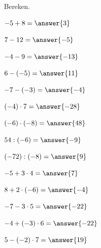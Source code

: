 \documentclass{ximera}
\begin{document}
\begin{oefening}{\oefB\ESS}

Bereken.

\begin{question} \(-5+8=\answer{3}\) \end{question}

\begin{question} \(7-12=\answer{-5}\) \end{question}

\begin{question} \(-4-9=\answer{-13}\) \end{question}

\begin{question} \(6-(-5)=\answer{11}\) \end{question}

\begin{question} \(-7-(-3)=\answer{-4}\) \end{question}

\begin{question} \((-4)\cdot7=\answer{-28}\) \end{question}

\begin{question} \((-6)\cdot(-8)=\answer{48}\) \end{question}

\begin{question} \(54:(-6)=\answer{-9}\) \end{question}

\begin{question} \((-72):(-8)=\answer{9}\) \end{question}

\begin{question} \(-5+3\cdot4=\answer{7}\) \end{question}

\begin{question} \(8+2\cdot(-6)=\answer{-4}\) \end{question}

\begin{question} \(-7-3\cdot5=\answer{-22}\) \end{question}

\begin{question} \(-4+(-3)\cdot6=\answer{-22}\) \end{question}

\begin{question} \(5-(-2)\cdot7=\answer{19}\) \end{question}


\end{oefening}
\end{document}

